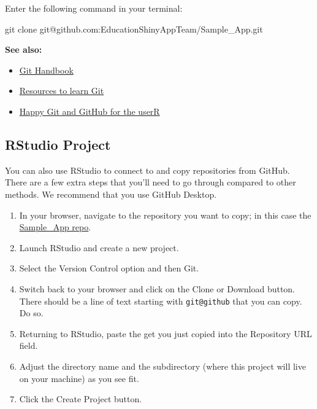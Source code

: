 \documentclass[
]{book}
\newenvironment{Shaded}{\begin{snugshade}}{\end{snugshade}}
\newcommand{\FunctionTok}[1]{\textcolor[rgb]{0.00,0.00,0.00}{#1}}
\newcommand{\NormalTok}[1]{#1}
\providecommand{\tightlist}{%
  \setlength{\itemsep}{0pt}\setlength{\parskip}{0pt}}
\begin{document}
Enter the following command in your terminal:

\begin{Shaded}
\begin{Highlighting}[]
\FunctionTok{git}\NormalTok{ clone git@github.com:EducationShinyAppTeam/Sample_App.git}
\end{Highlighting}
\end{Shaded}

\textbf{See also:}

\begin{itemize}
\tightlist
\item
  \href{https://guides.github.com/introduction/git-handbook/}{Git Handbook}
\item
  \href{https://try.github.io/}{Resources to learn Git}
\item
  \href{https://happygitwithr.com/}{Happy Git and GitHub for the userR}
\end{itemize}

\hypertarget{rstudio-project}{%
\subsection{RStudio Project}\label{rstudio-project}}

You can also use RStudio to connect to and copy repositories from GitHub. There are a few extra steps that you'll need to go through compared to other methods. We recommend that you use GitHub Desktop.

\begin{enumerate}
\def\labelenumi{\arabic{enumi}.}
\tightlist
\item
  In your browser, navigate to the repository you want to copy; in this case the \href{https://github.com/EducationShinyAppTeam/Sample_App}{Sample\_App repo}.
\item
  Launch RStudio and create a new project.
\item
  Select the Version Control option and then Git.
\item
  Switch back to your browser and click on the Clone or Download button. There should be a line of text starting with \texttt{git@github} that you can copy. Do so.
\item
  Returning to RStudio, paste the get you just copied into the Repository URL field.
\item
  Adjust the directory name and the subdirectory (where this project will live on your machine) as you see fit.
\item
  Click the Create Project button.
\end{enumerate}
\end{document}
